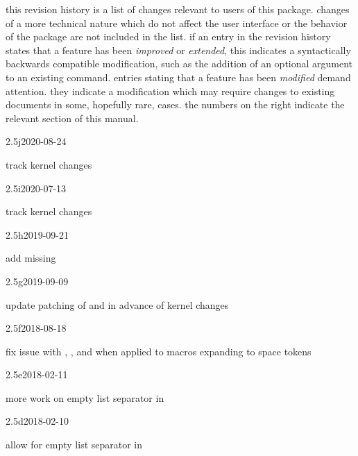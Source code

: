 this revision history is a list of changes relevant to users of this package. changes of a more technical nature which do not affect the user interface or the behavior of the package are not included in the list. if an entry in the revision history states that a feature has been \emph{improved} or \emph{extended}, this indicates a syntactically backwards compatible modification, such as the addition of an optional argument to an existing command. entries stating that a feature has been \emph{modified} demand attention. they indicate a modification which may require changes to existing documents in some, hopefully rare, cases. the numbers on the right indicate the relevant section of this manual.

\begin{changelog}

\begin{release}{2.5j}{2020-08-24}
\item track \latexe{} kernel changes
\end{release}

\begin{release}{2.5i}{2020-07-13}
\item track \latexe{} kernel changes
\end{release}

\begin{release}{2.5h}{2019-09-21}
\item add missing 
\end{release}

\begin{release}{2.5g}{2019-09-09}
\item update patching of  and  in advance of \latex{}
  kernel changes
\end{release}

\begin{release}{2.5f}{2018-08-18}
\item fix issue with , , 
  and  when applied to macros expanding to space tokens
\end{release}

\begin{release}{2.5e}{2018-02-11}
\item more work on empty list separator in 
\end{release}

\begin{release}{2.5d}{2018-02-10}
\item allow for empty list separator in 
\end{release}


\end{changelog}

